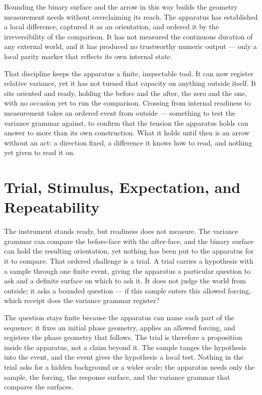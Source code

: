 Bounding the binary surface and the arrow in this way builds the geometry measurement needs without overclaiming its reach. The apparatus has established a local difference, captured it as an orientation, and ordered it by the irreversibility of the comparison. It has not measured the continuous duration of any external world, and it has produced no trustworthy numeric output --- only a local parity marker that reflects its own internal state. 

That discipline keeps the apparatus a finite, inspectable tool. It can now register relative variance, yet it has not turned that capacity on anything outside itself. It sits oriented and ready, holding the before and the after, the zero and the one, with no occasion yet to run the comparison. Crossing from internal readiness to measurement takes an ordered event from outside --- something to test the variance grammar against, to confirm that the tension the apparatus holds can answer to more than its own construction. What it holds until then is an arrow without an act: a direction fixed, a difference it knows how to read, and nothing yet given to read it on.


\section{Trial, Stimulus, Expectation, and Repeatability}

The instrument stands ready, but readiness does not measure. The variance grammar can compare the before-face with the after-face, and the binary surface can hold the resulting orientation, yet nothing has been put to the apparatus for it to compare. That ordered challenge is a trial. A trial carries a hypothesis with a sample through one finite event, giving the apparatus a particular question to ask and a definite surface on which to ask it. It does not judge the world from outside; it asks a bounded question --- if this sample enters this allowed forcing, which receipt does the variance grammar register?

The question stays finite because the apparatus can name each part of the sequence: it fixes an initial phase geometry, applies an allowed forcing, and registers the phase geometry that follows. The trial is therefore a proposition inside the apparatus, not a claim beyond it. The sample tanges the hypothesis into the event, and the event gives the hypothesis a local test. Nothing in the trial asks for a hidden background or a wider scale; the apparatus needs only the sample, the forcing, the response surface, and the variance grammar that compares the surfaces.

